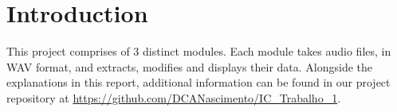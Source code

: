 \chapter{Introduction}

This project comprises of 3 distinct modules. Each module takes audio files, in WAV format, and extracts, modifies and displays their data. Alongside the explanations in this report, additional information can be found in our project repository at \url{https://github.com/DCANascimento/IC_Trabalho_1}.

